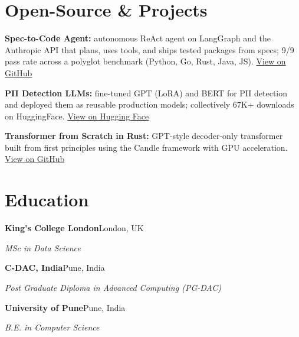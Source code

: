 \documentclass[10pt,a4paper]{article}
\begin{document}
\section{Open-Source \& Projects}
\begin{tight}
  \item \textbf{Spec-to-Code Agent:} autonomous ReAct agent on LangGraph and the Anthropic API that plans, uses tools, and ships tested packages from specs; 9/9 pass rate across a polyglot benchmark (Python, Go, Rust, Java, JS). \href{https://github.com/abhijeetscode/Spec-to-Code-Agent}{View on GitHub}
  \item \textbf{PII Detection LLMs:} fine-tuned GPT (LoRA) and BERT for PII detection and deployed them as reusable production models; collectively 67K+ downloads on HuggingFace. \href{https://huggingface.co/ab-ai/pii_model}{View on Hugging Face}
  \item \textbf{Transformer from Scratch in Rust:} GPT-style decoder-only transformer built from first principles using the Candle framework with GPU acceleration. \href{https://github.com/abhijeetscode/transformer-rust}{View on GitHub}
\end{tight}

\section{Education}
{\color{company}\bfseries King's College London}\hfill {\color{muted}London, UK}\par
{\itshape MSc in Data Science}\par\vspace{2pt}
{\color{company}\bfseries C-DAC, India}\hfill {\color{muted}Pune, India}\par
{\itshape Post Graduate Diploma in Advanced Computing (PG-DAC)}\par\vspace{2pt}
{\color{company}\bfseries University of Pune}\hfill {\color{muted}Pune, India}\par
{\itshape B.E. in Computer Science}\par
\end{document}
